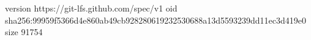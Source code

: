 version https://git-lfs.github.com/spec/v1
oid sha256:99959f5366d4e860ab49cb928280619232530688a13d5593239dd11ec3d419e0
size 91754

